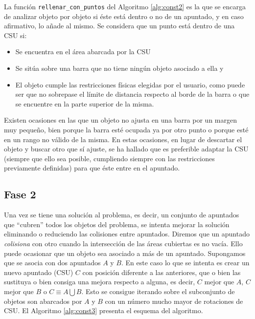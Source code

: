 La función \texttt{rellenar\_con\_puntos} del Algoritmo \ref{alg:const2} es la
que se encarga de analizar objeto por objeto si éste está dentro o no de un
apuntado, y en caso afirmativo, lo añade al mismo. 
Se considera que un punto está dentro de una CSU si:
\begin{itemize}
\item Se encuentra en el área abarcada por la CSU
\item Se sitúa sobre una barra que no tiene ningún objeto asociado a ella y 
\item El objeto cumple las restricciones físicas elegidas por el usuario, como puede ser que no
sobrepase el límite de distancia respecto al borde de la barra o que se
encuentre en la parte superior de la misma. 
\end{itemize}
Existen ocasiones en las que un
objeto no ajusta en una barra por un margen muy pequeño, bien porque la barra esté
ocupada ya por otro punto o porque esté en un rango no válido de la misma. 
En estas ocasiones, en lugar de descartar el objeto y buscar otro que sí ajuste, se ha hallado que
es preferible adaptar la CSU (siempre que ello sea posible, cumpliendo siempre con las
restricciones previamente definidas) para que éste entre en el apuntado.

\subsection{Fase 2} \label{subsec:fase2}
Una vez se tiene una solución al problema, es decir, un conjunto de apuntados
que ``cubren'' todos los objetos del problema, se intenta mejorar la solución eliminando o
reduciendo las colisiones entre apuntados. 
Diremos que un apuntado \textit{colisiona} con
otro cuando la intersección de las áreas cubiertas es no vacía.
Ello puede ocasionar que un objeto sea asociado a más de un apuntado.
Supongamos que se asocia con dos apuntados $A$ y $B$.
En este caso lo que
se intenta es crear un nuevo apuntado (CSU) $C$ con posición diferente a las
anteriores, que o bien las sustituya o bien consiga una mejora respecto a
alguna, es decir, $C$ mejor que $A$, $C$ mejor que $B$ o $C \equiv A \bigcup B$.
Esto se consigue iterando sobre el subconjunto de objetos son abarcados por $A$ y $B$
con un número mucho mayor de rotaciones de CSU. 
El Algoritmo \ref{alg:const3} presenta el esquema del algoritmo.

